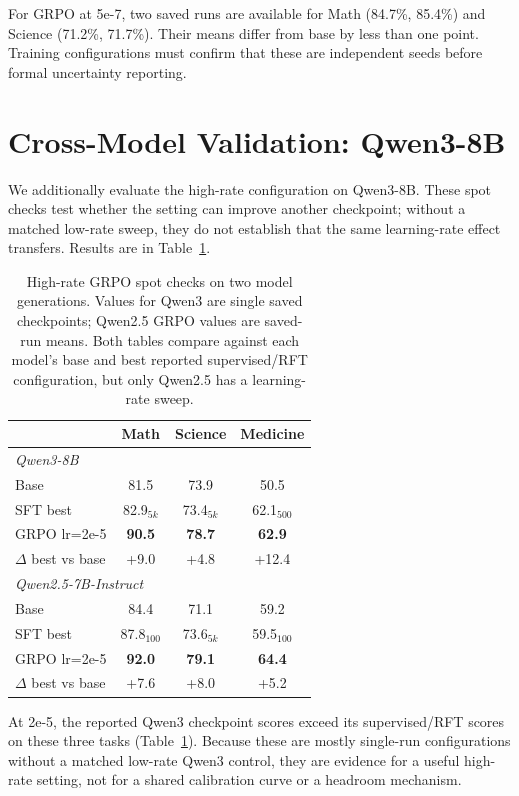 \documentclass[11pt]{article}
\begin{document}
For GRPO at 5e-7, two saved runs are available for Math (84.7\%, 85.4\%) and Science (71.2\%, 71.7\%). Their means differ from base by less than one point. Training configurations must confirm that these are independent seeds before formal uncertainty reporting.

\section{Cross-Model Validation: Qwen3-8B}
\label{sec:cross_model}

We additionally evaluate the high-rate configuration on Qwen3-8B. These spot checks test whether the setting can improve another checkpoint; without a matched low-rate sweep, they do not establish that the same learning-rate effect transfers. Results are in Table~\ref{tab:cross_model_full}.

\begin{table}[h]
\centering
\small
\begin{tabular}{@{}lccc@{}}
\toprule
& \textbf{Math} & \textbf{Science} & \textbf{Medicine} \\
\midrule
\multicolumn{4}{l}{\textit{Qwen3-8B}} \\
\midrule
Base & 81.5 & 73.9 & 50.5 \\
SFT best & 82.9$_{5k}$ & 73.4$_{5k}$ & 62.1$_{500}$ \\
GRPO lr=2e-5 & \textbf{90.5} & \textbf{78.7} & \textbf{62.9} \\
$\Delta$ best vs base & +9.0 & +4.8 & +12.4 \\
\midrule
\multicolumn{4}{l}{\textit{Qwen2.5-7B-Instruct}} \\
\midrule
Base & 84.4 & 71.1 & 59.2 \\
SFT best & 87.8$_{100}$ & 73.6$_{5k}$ & 59.5$_{100}$ \\
GRPO lr=2e-5 & \textbf{92.0} & \textbf{79.1} & \textbf{64.4} \\
$\Delta$ best vs base & +7.6 & +8.0 & +5.2 \\
\bottomrule
\end{tabular}
\caption{High-rate GRPO spot checks on two model generations. Values for Qwen3 are single saved checkpoints; Qwen2.5 GRPO values are saved-run means. Both tables compare against each model's base and best reported supervised/RFT configuration, but only Qwen2.5 has a learning-rate sweep.}
\label{tab:cross_model_full}
\end{table}

At 2e-5, the reported Qwen3 checkpoint scores exceed its supervised/RFT scores on these three tasks (Table~\ref{tab:cross_model_full}). Because these are mostly single-run configurations without a matched low-rate Qwen3 control, they are evidence for a useful high-rate setting, not for a shared calibration curve or a headroom mechanism.
\end{document}
